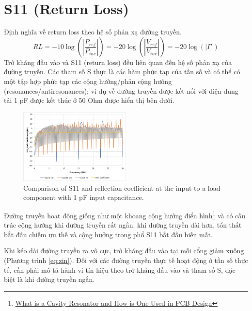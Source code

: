     \section{S11 (Return Loss)}
        Định nghĩa về return loss theo hệ số phản xạ đường truyền.
        $$RL = -10\log\left(\left|\frac{P_{ref}}{P_{inc}}\right|\right) = -20\log\left(\left|\frac{V_{ref}}{V_{inc}}\right|\right) = -20\log\left(\left|\Gamma\right|\right)$$
        Trở kháng đầu vào và S11 (return loss) đều liên quan đến hệ số phản xạ của đường truyền. Các tham số S thực là các hàm phức tạp của tần số và có thể có một tập hợp phức tạp các cộng hưởng/phản cộng hưởng (resonances/antiresonances); ví dụ về đường truyền được kết nối với điện dung tải 1 pF được kết thúc ở 50 Ohm được hiển thị bên dưới.\par
        \begin{figure}[h]
            \centering
            \includegraphics[width=0.5\textwidth]{figures/1pf_input.png}
            \caption{Comparison of S11 and reflection coefficient at the input to a load component with 1 pF input capacitance.}
        \end{figure}

        Đường truyền hoạt động giống như một khoang cộng hưởng điển hình\footnote{\href{https://resources.pcb.cadence.com/blog/2019-what-is-a-cavity-resonator-and-how-is-one-used-in-pcb-design}{\color{blue}What is a Cavity Resonator and How is One Used in PCB Design}} và có cấu trúc cộng hưởng khi đường truyền rất ngắn. khi đường truyền dài hơn, tổn thất bắt đầu chiếm ưu thế và cộng hưởng trong phổ S11 bắt đầu biến mất.\cite{cadence2021transmission}\par
        Khi kéo dài đường truyền ra vô cực, trở kháng đầu vào tại mỗi cổng giảm xuống (Phương trình \ref{eq:zin}). Đối với các đường truyền thực tế hoạt động ở tần số thực tế, cần phải mô tả hành vi tín hiệu theo trở kháng đầu vào và tham số S, đặc biệt là khi đường truyền ngắn.\cite{cadence2021transmission}\par